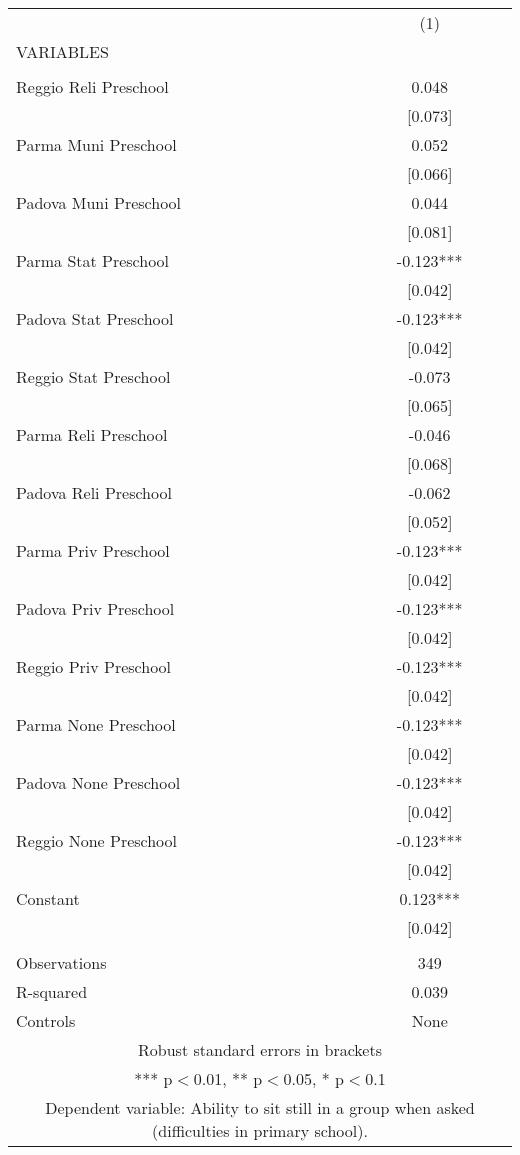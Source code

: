 \begin{tabular}{lc} \hline
 & (1) \\
VARIABLES &  \\ \hline
 &  \\
Reggio Reli Preschool & 0.048 \\
 & [0.073] \\
Parma Muni Preschool & 0.052 \\
 & [0.066] \\
Padova Muni Preschool & 0.044 \\
 & [0.081] \\
Parma Stat Preschool & -0.123*** \\
 & [0.042] \\
Padova Stat Preschool & -0.123*** \\
 & [0.042] \\
Reggio Stat Preschool & -0.073 \\
 & [0.065] \\
Parma Reli Preschool & -0.046 \\
 & [0.068] \\
Padova Reli Preschool & -0.062 \\
 & [0.052] \\
Parma Priv Preschool & -0.123*** \\
 & [0.042] \\
Padova Priv Preschool & -0.123*** \\
 & [0.042] \\
Reggio Priv Preschool & -0.123*** \\
 & [0.042] \\
Parma None Preschool & -0.123*** \\
 & [0.042] \\
Padova None Preschool & -0.123*** \\
 & [0.042] \\
Reggio None Preschool & -0.123*** \\
 & [0.042] \\
Constant & 0.123*** \\
 & [0.042] \\
 &  \\
Observations & 349 \\
R-squared & 0.039 \\
 Controls & None \\ \hline
\multicolumn{2}{c}{ Robust standard errors in brackets} \\
\multicolumn{2}{c}{ *** p$<$0.01, ** p$<$0.05, * p$<$0.1} \\
\multicolumn{2}{c}{ Dependent variable: Ability to sit still in a group when asked (difficulties in primary school).} \\
\end{tabular}
